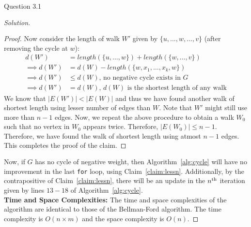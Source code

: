 \begin{solution}{Question 3.1}
\begin{proof}[Solution]
\begin{proof}
            Now consider the length of walk $W'$ given by $\{u, \ldots, w, \ldots, v\}$ (after removing the cycle at $w$):
            \begin{equation}
                \begin{split}
                    d(W') &= length(\{u, \ldots, w\}) + length(\{w, \ldots, v\})\\
                    \implies d(W') &= d(W) - length(\{w, x_1, \ldots, x_k, w\})\\
                    \implies d(W') &\leq d(W)\text{, no negative cycle exists in }G\\
                    \implies d(W') &= d(W)\text{, $d(W)$ is the shortest length of any walk}
                \end{split}
            \end{equation}
            We know that $|E(W')|<|E(W)|$ and thus we have found another walk of shortest length using lesser number of edges than $W$. Note that $W'$ might still use more than $n-1$ edges. Now, we repeat the above procedure to obtain a walk $W_0$ such that no vertex in $W_0$ appears twice. Therefore, $|E(W_0)|\leq n-1$. Therefore, we have found the walk of shortest length using atmost $n-1$ edges. This completes the proof of the claim.
        \end{proof}
        Now, if $G$ has no cycle of negative weight, then Algorithm~\ref{alg:cycle} will have no improvement in the last \texttt{for} loop, using Claim~\ref{claim:lessn}. Additionally, by the contrapositive of Claim~\ref{claim:lessn}, there will be an update in the $n\textsuperscript{th}$ iteration given by lines $13-18$ of Algorithm~\ref{alg:cycle}.\\

        \textbf{Time and Space Complexities:} The time and space complexities of the algorithm are identical to those of the Bellman-Ford algorithm. The time complexity is $O(n\times m)$ and the space complexity is $O(n)$.
    \end{proof}
\end{solution}
